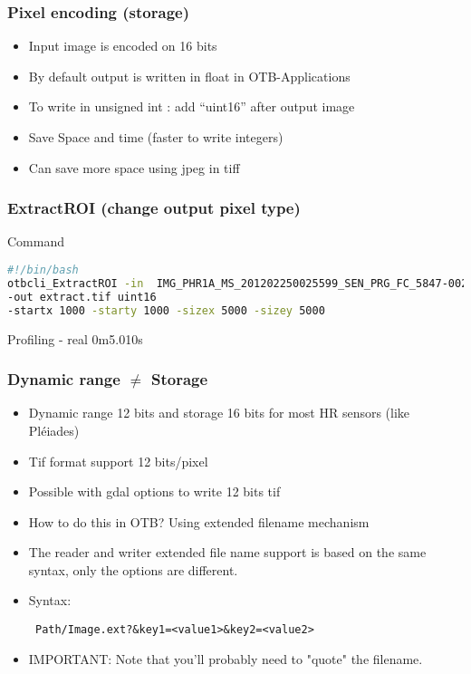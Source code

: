 \documentclass[8pt]{beamer}
\begin{document}
\begin{frame}
\frametitle{Pixel encoding (storage)}
\begin{itemize}
\item Input image is encoded on 16 bits
\item  By default output is written in float in OTB-Applications
\item  To write in unsigned int : add ``uint16'' after output image
\item Save Space and time (faster to write integers)
\item Can save more space using jpeg in tiff
\end{itemize}
\end{frame}


\begin{frame}[fragile]
\frametitle{ExtractROI (change output pixel type)}

\begin{block}{Command}
\begin{lstlisting}[language=bash]
#!/bin/bash
otbcli_ExtractROI -in  IMG_PHR1A_MS_201202250025599_SEN_PRG_FC_5847-002_R1C1.TIF 
-out extract.tif uint16 
-startx 1000 -starty 1000 -sizex 5000 -sizey 5000
\end{lstlisting}
\end{block}

\begin{block}{Profiling}
- real	0m5.010s
\end{block}

\end{frame}

\begin{frame}[fragile]
\frametitle{Dynamic range $\neq$ Storage}
\begin{itemize}
\item Dynamic range 12 bits and storage 16 bits for most HR sensors (like Pléiades)
\item Tif format support 12 bits/pixel
\item Possible with gdal options to write 12 bits tif
\item How to do this in OTB? Using extended filename mechanism
\item The reader and writer extended file name support is based on the same syntax, only the options are different.
\item Syntax: \begin{verbatim} Path/Image.ext?&key1=<value1>&key2=<value2> \end{verbatim}
\item IMPORTANT: Note that you'll probably need to "quote" the filename. 
\end{itemize}
\end{frame}
\end{document}
